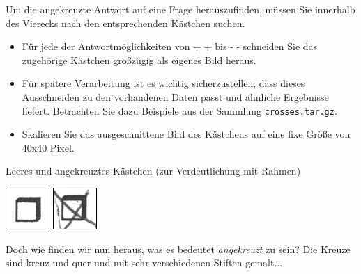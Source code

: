 \vspace{-1.5em}

Um die angekreuzte Antwort auf eine Frage herauszufinden, müssen Sie innerhalb des Vierecks nach den entsprechenden Kästchen suchen.
\begin{itemize}
\item Für jede der Antwortmöglichkeiten von + + bis - - schneiden Sie das zugehörige Kästchen großzügig als eigenes Bild heraus.
\item Für spätere Verarbeitung ist es wichtig sicherzustellen, dass dieses Ausschneiden zu den vorhandenen Daten passt und ähnliche Ergebnisse liefert.
Betrachten Sie dazu Beispiele aus der Sammlung \lstinline{crosses.tar.gz}.
\item Skalieren Sie das ausgeschnittene Bild des Kästchens auf eine fixe Größe von 40x40 Pixel.
\end{itemize}
Leeres und angekreuztes Kästchen (zur Verdeutlichung mit Rahmen)\\
\begin{center}
\includegraphics{bilder/cross_empty_example.png}
\includegraphics{bilder/cross_crossed_example.png}\\
\end{center}

Doch wie finden wir nun heraus, was es bedeutet \emph{angekreuzt} zu sein? Die Kreuze sind kreuz und quer und mit sehr verschiedenen Stiften gemalt...
\vspace{1.5em}
